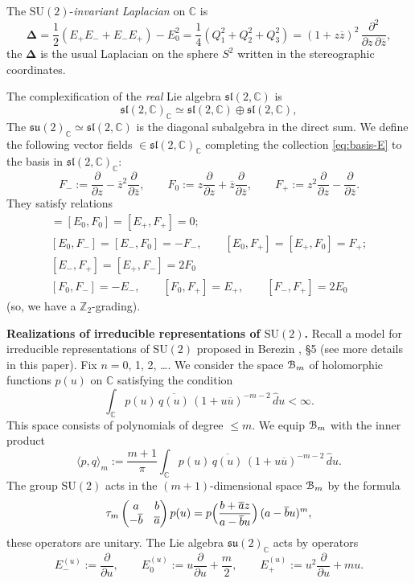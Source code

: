 \documentclass[10pt,a4paper]{amsart}
\newcounter{sec}
\newcounter{punct}[sec]
\def\punct{\refstepcounter{punct}{\arabic{sec}.\arabic{punct}.  }}
\def\SU{\mathrm {SU}}
\def\le{\leqslant}
\def\la{\langle}
\def\ra{\rangle}
\def\cB{\EuScript B}
\def\C {{\mathbb C }}
\def\Z{{\mathbb Z}}
\def\ov{\overline}
\def\wh{\widehat}
\def\sm{\smallskip}
\def\DeltA{\boldsymbol{\Delta}}
\begin{document}
The $\SU(2)$-{\it invariant Laplacian} on $\C$ 
is
\begin{equation}
\DeltA=
\frac12 (E_+E_-+E_-E_+)- E_0^2=
\frac14(Q_1^2+Q_2^2+Q_3^2)=
(1+z\ov z)^2 \,\frac{\partial^2}{\partial z\, \partial \ov z},
\end{equation}
the $\DeltA$ is the usual Laplacian on the sphere $S^2$ written
in the stereographic coordinates.

The complexification of the {\it real} Lie algebra $\mathfrak{sl}(2,\C)$
is
$$
\mathfrak{sl}(2,\C)_\C\simeq \mathfrak{sl}(2,\C)\oplus \mathfrak{sl}(2,\C),
$$
The $\mathfrak{su}(2)_\C\simeq \mathfrak{sl}(2,\C)$ is
the diagonal subalgebra in the direct sum.
We define the following vector fields $\in \mathfrak{sl}(2,\C)_\C$
completing the collection \eqref{eq:basis-E} to the basis
in $\mathfrak{sl}(2,\C)_\C$:
\begin{equation}
F_-:=\frac{\partial}{\partial z}-\ov z^2 \frac{\partial}{\partial \ov z},
\qquad 
F_0:=z\frac{\partial}{\partial z}+\ov z\frac{\partial}{\partial \ov z},\qquad
F_+:=z^2\frac{\partial}{\partial z}-\frac{\partial}{\partial \ov z}.
\label{eq:basis-F}
\end{equation}
They satisfy relations
\begin{gather}
[E_-,F_-]= [E_0,F_0]=[E_+,F_+]=0;
\\
[E_0, F_-]=[E_-,F_0]=-F_-,\qquad [E_0, F_+]=[E_+,F_0]=F_+;
\\
 [E_-,F_+]=[E_+,F_-]=2 F_0
 \\
 [F_0,F_-]=-E_-,\qquad [F_0,F_+]=E_+,\qquad [F_-,F_+]=2E_0
\end{gather}
(so, we have a $\Z_2$-grading).

\sm

{\bf \punct Realizations of irreducible representations of $\SU(2)$.}
Recall a model for irreducible representations of $\SU(2)$
proposed in Berezin \cite{Ber}, \S 5 (see more details in this paper).
Fix $n=0$, 1, 2, \dots. We consider the space $\cB_m$ of
holomorphic functions $p(u)$ on $\C$
satisfying the condition
$$
\int_\C p(u)\,\ov{q(u)}\,(1+u\ov u)^{-m-2}\,\wh d u<\infty
.$$
This  space consists of
  polynomials of degree $\le m$.
We equip $\cB_m$  with the inner product
$$
\bigl\la p,q \bigr\ra_m:=
\frac {m+1}\pi\int_\C p(u)\,\ov{q(u)}\,(1+u\ov u)^{-m-2}\,\wh d u.
$$ 
The group $\SU(2)$ acts in the $(m+1)$-dimensional
 space $\cB_m$ by the formula
$$
\tau_m\begin{pmatrix}
a&b\\-\ov b&\ov a
\end{pmatrix} p(u)=
p\Bigl(\frac{b+\ov a z}{a-\ov b u}\Bigr)\,(a-\ov b u)^m,
$$
these operators are unitary. The Lie algebra
$\mathfrak{su}(2)_\C$
acts by operators
\begin{equation}
E^{(u)}_-:=\frac{\partial}{\partial u},\qquad
E^{(u)}_0:=u \frac{\partial}{\partial u}+\frac{m}{2},
\qquad E^{(u)}_+:=u^2\frac{\partial}{\partial u}+m u.
\end{equation}
\end{document}
